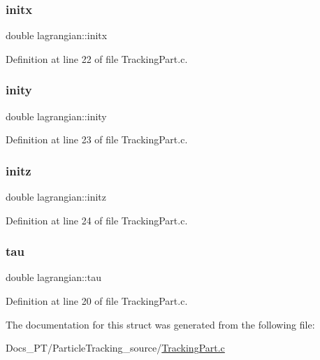 \subsubsection{\texorpdfstring{initx}{initx}}
{\footnotesize\ttfamily double lagrangian\+::initx}



Definition at line 22 of file Tracking\+Part.\+c.

\mbox{\label{structlagrangian_a75fb1c376f05bb7ba3eaee13cab24067}} 
\subsubsection{\texorpdfstring{inity}{inity}}
{\footnotesize\ttfamily double lagrangian\+::inity}



Definition at line 23 of file Tracking\+Part.\+c.

\mbox{\label{structlagrangian_a44e890e0ddb81f46f4aa3c1e7c029a73}} 
\subsubsection{\texorpdfstring{initz}{initz}}
{\footnotesize\ttfamily double lagrangian\+::initz}



Definition at line 24 of file Tracking\+Part.\+c.

\mbox{\label{structlagrangian_a6c0717ffd474442f1651a1f7ebec625f}} 
\subsubsection{\texorpdfstring{tau}{tau}}
{\footnotesize\ttfamily double lagrangian\+::tau}



Definition at line 20 of file Tracking\+Part.\+c.



The documentation for this struct was generated from the following file\+:\begin{DoxyCompactItemize}
\item 
Docs\+\_\+\+P\+T/\+Particle\+Tracking\+\_\+source/\mbox{\hyperlink{_tracking_part_8c}{Tracking\+Part.\+c}}\end{DoxyCompactItemize}

